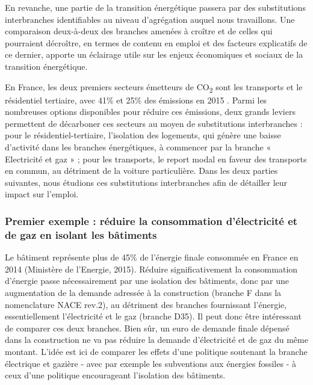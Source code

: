 En revanche, une partie de la transition énergétique passera par des substitutions interbranches identifiables au niveau d’agrégation auquel nous travaillons. Une comparaison deux-à-deux des branches amenées à croître et de celles qui pourraient décroître, en termes de contenu en emploi et des facteurs explicatifs de ce dernier, apporte un éclairage utile sur les enjeux économiques et sociaux de la transition énergétique. 

En France, les deux premiers secteurs émetteurs de CO\textsubscript{2} sont les transports et le résidentiel tertiaire, avec 41\% et 25\% des émissions en 2015 \citep{Dussud2016}. 
Parmi les nombreuses options disponibles pour réduire ces émissions, deux grands leviers permettent de décarboner ces secteurs au moyen de substitutions interbranches
: pour le résidentiel-tertiaire, l’isolation des logements, qui génère une baisse d’activité dans les branches énergétiques, à commencer par la branche « Electricité et gaz » ; pour les transports, le report modal en faveur des transports en commun, au détriment de la voiture particulière.
Dans les deux parties suivantes, nous étudions ces substitutions interbranches afin de détailler leur impact sur l'emploi. 

\subsubsection{Premier exemple : réduire la consommation d'électricité et de gaz en isolant les bâtiments}

Le bâtiment représente plus de 45\% de l’énergie finale consommée en France en 2014 (Ministère de l’Energie, 2015). Réduire significativement la consommation d’énergie passe nécessairement par une isolation des bâtiments, donc par une augmentation de la demande adressée à la construction (branche F dans la nomenclature NACE rev.2), au détriment des branches fournissant l’énergie, essentiellement l’électricité et le gaz (branche D35). Il peut donc être intéressant de comparer ces deux branches. Bien sûr, un euro de demande finale dépensé dans la construction ne va pas réduire la demande d'électricité et de gaz du même montant. L'idée est ici de comparer les effets d’une politique soutenant la branche électrique et gazière - avec par exemple les subventions aux énergies fossiles \citep{OCDE2015} - à ceux d’une politique encourageant l'isolation des bâtiments. 

